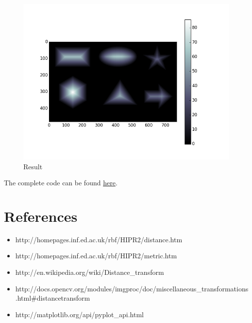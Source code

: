 \documentclass[]{article}
\providecommand{\tightlist}{%
  \setlength{\itemsep}{0pt}\setlength{\parskip}{0pt}}
\begin{document}
\begin{figure}[htbp]
\centering
\includegraphics{images/Distance Transform/Result.png}
\caption{Result}
\end{figure}

The complete code can be found
\href{https://github.com/eyantrainternship/eYSIP_2015_Marker_based_Robot_Localisation/tree/master/Task-3/Distance\%20Transform/src}{here}.

\section{References}\label{references}

\begin{itemize}
\tightlist
\item
  http://homepages.inf.ed.ac.uk/rbf/HIPR2/distance.htm
\item
  http://homepages.inf.ed.ac.uk/rbf/HIPR2/metric.htm
\item
  http://en.wikipedia.org/wiki/Distance\_transform
\item
  http://docs.opencv.org/modules/imgproc/doc/miscellaneous\_transformations.html\#distancetransform
\item
  http://matplotlib.org/api/pyplot\_api.html
\end{itemize}
\end{document}
